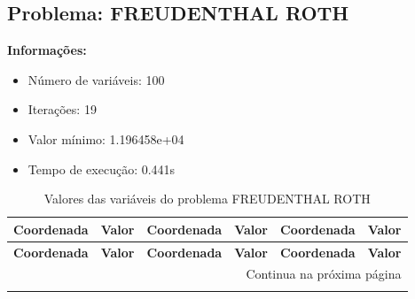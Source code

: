 \documentclass[12pt]{article}
\begin{document}
\newpage            
\subsection{Problema: FREUDENTHAL ROTH}

\textbf{Informações:}
\begin{itemize}
\item Número de variáveis: 100
\item Iterações: 19
\item Valor mínimo: 1.196458e+04
\item Tempo de execução: 0.441s
\end{itemize}

\small
\begin{longtable}{@{}cc|cc|cc@{}}
\caption{Valores das variáveis do problema FREUDENTHAL ROTH} \\
\toprule
\textbf{Coordenada} & \textbf{Valor} & \textbf{Coordenada} & \textbf{Valor} & \textbf{Coordenada} & \textbf{Valor} \\
\midrule
\endfirsthead

\toprule
\textbf{Coordenada} & \textbf{Valor} & \textbf{Coordenada} & \textbf{Valor} & \textbf{Coordenada} & \textbf{Valor} \\
\midrule
\endhead

\midrule \multicolumn{6}{r}{{Continua na próxima página}} \\ \midrule
\endfoot


\end{longtable}
\end{document}
